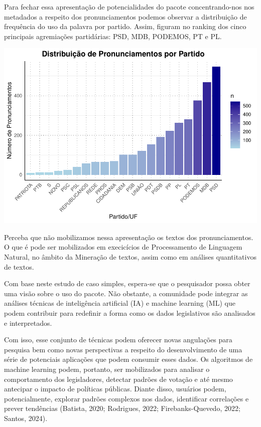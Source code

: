 \documentclass{article}
\begin{document}
Para fechar essa apresentação de potencialidades do pacote
concentrando-nos nos metadados a respeito dos pronunciamentos podemos
observar a distribuição de frequência do uso da palavra por partido.
Assim, figuram no ranking dos cinco principais agremiações partidárias:
PSD, MDB, PODEMOS, PT e PL.

\includegraphics{Texto_files/figure-latex/unnamed-chunk-14-1.pdf}

Perceba que não mobilizamos nessa apresentação os textos dos
pronunciamentos. O que é pode ser mobilizados em execicícios de
Processamento de Linguagem Natural, no âmbito da Mineração de textos,
assim como em análises quantitativos de textos.

Com base neste estudo de caso simples, espera-se que o pesquisador possa
obter uma visão sobre o uso do pacote. Não obstante, a comunidade pode
integrar as análises técnicas de inteligência artificial (IA) e machine
learning (ML) que podem contribuir para redefinir a forma como os dados
legislativos são analisados e interpretados.

Com isso, esse conjunto de técnicas podem oferecer novas angulações para
pesquisa bem como novas perspectivas a respeito do desenvolvimento de
uma série de potenciais aplicações que podem consumir esses dados. Os
algoritmos de machine learning podem, portanto, ser mobilizados para
analisar o comportamento dos legisladores, detectar padrões de votação e
até mesmo antecipar o impacto de políticas públicas. Diante disso,
usuários podem, potencialmente, explorar padrões complexos nos dados,
identificar correlações e prever tendências (Batista, 2020; Rodrigues,
2022; Firebanks-Quevedo, 2022; Santos, 2024).
\end{document}

